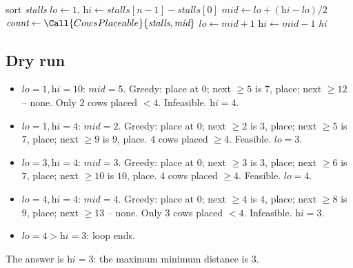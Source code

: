 \begin{algorithm}[H]
\caption{Aggressive Cows}
\begin{algorithmic}[1]
  \State sort \textit{stalls}
  \State $\textit{lo} \gets 1$, $\textit{hi} \gets \textit{stalls}[n-1] - \textit{stalls}[0]$
    \State $\textit{mid} \gets \textit{lo}+(\textit{hi}-\textit{lo})/2$
    \State $\textit{count} \gets \Call{CowsPlaceable}{\textit{stalls}, \textit{mid}}$
      \State $\textit{lo} \gets \textit{mid} + 1$
    \Else
      \State $\textit{hi} \gets \textit{mid} - 1$
    \EndIf
  \EndWhile
  \State \Return \textit{hi}
\EndProcedure
\end{algorithmic}
\end{algorithm}

\subsection*{Dry run}


\begin{itemize}
  \item $\textit{lo}=1,\textit{hi}=10$: $\textit{mid}=5$. Greedy: place at
        $0$; next $\ge 5$ is $7$, place; next $\ge 12$ -- none. Only $2$
        cows placed $< 4$. Infeasible. $\textit{hi}=4$.
  \item $\textit{lo}=1,\textit{hi}=4$: $\textit{mid}=2$. Greedy: place at
        $0$; next $\ge 2$ is $3$, place; next $\ge 5$ is $7$, place; next
        $\ge 9$ is $9$, place. $4$ cows placed $\ge 4$. Feasible.
        $\textit{lo}=3$.
  \item $\textit{lo}=3,\textit{hi}=4$: $\textit{mid}=3$. Greedy: place at
        $0$; next $\ge 3$ is $3$, place; next $\ge 6$ is $7$, place; next
        $\ge 10$ is $10$, place. $4$ cows placed $\ge 4$. Feasible.
        $\textit{lo}=4$.
  \item $\textit{lo}=4,\textit{hi}=4$: $\textit{mid}=4$. Greedy: place at
        $0$; next $\ge 4$ is $4$, place; next $\ge 8$ is $9$, place; next
        $\ge 13$ -- none. Only $3$ cows placed $< 4$. Infeasible.
        $\textit{hi}=3$.
  \item $\textit{lo}=4 > \textit{hi}=3$: loop ends.
\end{itemize}

The answer is $\textit{hi} = 3$: the maximum minimum distance is $3$.

